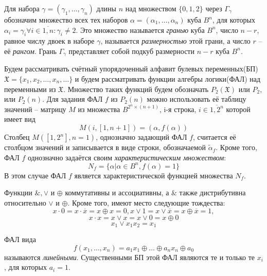 \documentclass[11pt]{article}
\newcounter{th}\setcounter{th}{0}
\begin{document}
Для набора \(\gamma = (\gamma_1, \ldots, \gamma_n)\) длины \(n\) над множеством \(\{0, 1, 2\}\) через \(\Gamma_{\gamma}\) обозначим множество всех тех наборов \(\alpha = (\alpha_1, \ldots, \alpha_n)\) куба \(B^n\), для которых \(\alpha_i = \gamma_i \forall i \in \overline{1, n}: \gamma_i \neq 2\). Это множество называется \emph{гранью} куба \(B^n\), число \(n - r\), равное числу двоек в наборе \(\gamma\), называется \emph{размерностью} этой грани, а число \(r\) -- её \emph{рангом}. Грань \(\Gamma_{\gamma}\) представляет собой подкуб размерности \(n - r\) куба \(B^n\).

Будем рассматривать счётный упорядоченный алфавит булевых переменных(БП) \(\mathfrak{X} = \{x_1, x_2, \ldots, x_n, \ldots\}\) и будем рассматривать функции алгебры логики(ФАЛ) над переменными из \(\mathfrak{X}\). Множество таких функций будем обозначать \(P_2(\mathfrak{X})\) или \(P_2\), или \(P_2(n)\). Для задания ФАЛ \(f\) из \(P_2(n)\) можно использовать её таблицу значений -- матрицу \(M\) из множества \(B^{2^n\times(n + 1)}\), i-я строка, \(i \in \overline{1, 2^n}\) которой имеет вид
\begin{equation*}
M(i, [1, n + 1]) = (\alpha, f(\alpha))
\end{equation*}
Столбец \(M([1, 2^n], n = 1)\), однозначно задающий ФАЛ \(f\), считается её столбцом значений и записывается в виде строки, обозначаемой \(\widetilde{\alpha}_f\). Кроме того, ФАЛ \(f\) однозначно задаётся своим \emph{характеристическим множеством}:
\begin{equation*}
N_f = \{\alpha | \alpha \in B^n, f(\alpha) = 1\}
\end{equation*}
В этом случае ФАЛ \(f\) является характеристической функцией множества \(N_f\).

Функции \(\&, \vee\) и \(\oplus\) коммутативны и ассоциативны, а \(\&\) также дистрибутивна относительно \(\vee\) и \(\oplus\). Кроме того, имеют место следующие тождества:
\begin{equation}
x\cdot0 = x\cdot\overline{x} = x\oplus x = 0, x\vee1 = x\vee\overline{x} = x\oplus\overline{x} = 1,
\end{equation}
\begin{equation}
x\cdot x = x\vee x = x\vee 0 = x\oplus 0
\end{equation}
\begin{equation}
\label{eq:merge}
x_1\vee x_1x_2 = x_1
\end{equation}

ФАЛ вида
\begin{equation*}
f(x_1, \ldots, x_n) = a_1x_1 \oplus \ldots \oplus a_nx_n \oplus a_0
\end{equation*}
называются \emph{линейными}. Существенными БП этой ФАЛ являются те и только те \(x_i\), для которых \(a_i = 1\).
\end{document}

